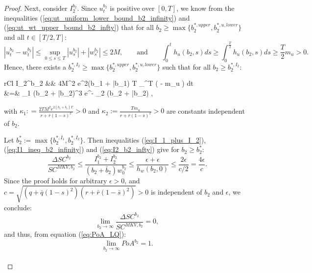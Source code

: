\documentclass[11pt]{article}
\begin{document}
\begin{proof}
	Next, consider $I_2^{b_2}$. Since $u_t^{b_2}$ is positive over $[0,T]$, we know from the inequalities (\ref{eq:ut_uniform_lower_bound_b2_infinity}) and (\ref{eq:ut_wt_upper_bound_b2_infty}) that for all $b_2 \geq \max\{ b_2^{*,upper}, b_2^{*,u,lower} \}$ and all $t \in [T/2,T]$:
	\begin{equation*}
		\left\vert u_t^{b_2} - w_t^{b_2} \right\vert \leq \sup_{0 \leq s \leq T} \left\vert u_s^{b_2} \right\vert + \left\vert w_s^{b_2} \right\vert  \leq 2M,
		\qquad \text{and} \qquad
		\int_0^{t} h_u(b_2,s) ds \geq \int_0^{\frac{T}{2}} h_u(b_2,s) ds \geq \frac{T}{2} m_u >0.
	\end{equation*}
	Hence, there exists a $b_2^{*,I_2} \geq \max \{ b_2^{*,upper}, b_2^{*,u,lower} \}$ such that for all $b_2 \geq b_2^{*,I_2}$:
	\begin{IEEEeqnarray}{rCl}
		I_2^{b_2} &\leq&   \cdot 4M^2 e^{2(b_1 + \bar{b}_1) T} \int_{}^{T} \exp\left( -  \cdot m_u \right) dt \nonumber\\	
		&=& \kappa_1 (b_2 + \bar{b}_2)^3 e^{- \kappa_2 (b_2 + \bar{b}_2)} \leq \epsilon,
	\label{eq:I2_b2_infty}
	\end{IEEEeqnarray}
	with $\kappa_1: = \frac{2 TM^2 e^{2(b_1 + \bar{b}_1) T} }{r + \bar{r}(1-\bar{s})^2} >0$ and $\kappa_2 :=  \frac{T  m_u}{r + \bar{r}(1-\bar{s})^2}>0$ are constants independent of $b_2$. 	
	
	Let $b_2^* := \max \{ b_2^{*,I_1}, b_2^{*,I_2}\}$. Then inequalities (\ref{eq:I_1_plus_I_2}), (\ref{eq:I1_ineq_b2_infinity}) and (\ref{eq:I2_b2_infty}) give for $b_2 \geq b_2^*$:
	\begin{equation*}
		\frac{\Delta SC^{b_2}}{SC^{MKV,b_2}} \leq \frac{I_1^{b_2} + I_2^{b_2}}{(b_2 + \bar{b}_2) w_0^{b_2}} \leq \frac{ \epsilon + \epsilon }{h_w(b_2,0)} \leq \frac{2\epsilon}{c/2}=\frac{4\epsilon}{c}.
	\end{equation*}
	Since the proof holds for arbitrary $\epsilon>0$, and $c=\sqrt{(q+\bar{q}(1-s)^2)(r+\bar{r}(1-\bar{s})^2)}>0$ is independent of $b_2$ and $\epsilon$, we conclude:
	\begin{equation*}
		\lim_{b_2 \to \infty} \frac{\Delta SC^{b_2}}{SC^{MKV,b_2}} = 0, 
	\end{equation*}
	and thus, from equation (\ref{eq:PoA_LQ}):
	$$ \lim_{b_2 \to \infty} PoA^{b_2} = 1.$$\\
	

\end{proof}
\end{document}
